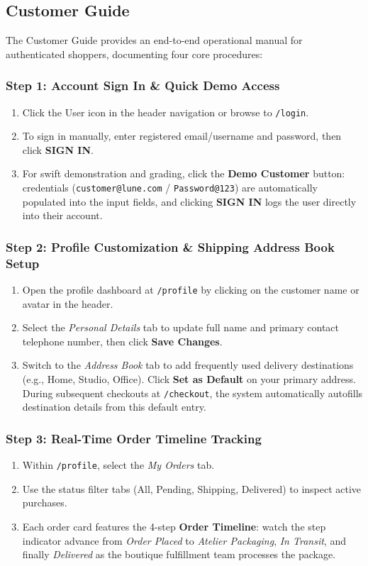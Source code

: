 \documentclass[12pt,a4paper,oneside]{report}
\begin{document}
\subsection{Customer Guide}
The Customer Guide provides an end-to-end operational manual for authenticated shoppers, documenting four core procedures:

\subsubsection{Step 1: Account Sign In \& Quick Demo Access}
\begin{enumerate}[leftmargin=1.2cm]
    \item Click the User icon in the header navigation or browse to \texttt{/login}.
    \item To sign in manually, enter registered email/username and password, then click \textbf{SIGN IN}.
    \item For swift demonstration and grading, click the \textbf{Demo Customer} button: credentials (\texttt{customer@lune.com} / \texttt{Password@123}) are automatically populated into the input fields, and clicking \textbf{SIGN IN} logs the user directly into their account.
\end{enumerate}

\subsubsection{Step 2: Profile Customization \& Shipping Address Book Setup}
\begin{enumerate}[leftmargin=1.2cm]
    \item Open the profile dashboard at \texttt{/profile} by clicking on the customer name or avatar in the header.
    \item Select the \textit{Personal Details} tab to update full name and primary contact telephone number, then click \textbf{Save Changes}.
    \item Switch to the \textit{Address Book} tab to add frequently used delivery destinations (e.g., Home, Studio, Office). Click \textbf{Set as Default} on your primary address. During subsequent checkouts at \texttt{/checkout}, the system automatically autofills destination details from this default entry.
\end{enumerate}

\subsubsection{Step 3: Real-Time Order Timeline Tracking}
\begin{enumerate}[leftmargin=1.2cm]
    \item Within \texttt{/profile}, select the \textit{My Orders} tab.
    \item Use the status filter tabs (All, Pending, Shipping, Delivered) to inspect active purchases.
    \item Each order card features the 4-step \textbf{Order Timeline}: watch the step indicator advance from \textit{Order Placed} to \textit{Atelier Packaging}, \textit{In Transit}, and finally \textit{Delivered} as the boutique fulfillment team processes the package.
\end{enumerate}
\end{document}
